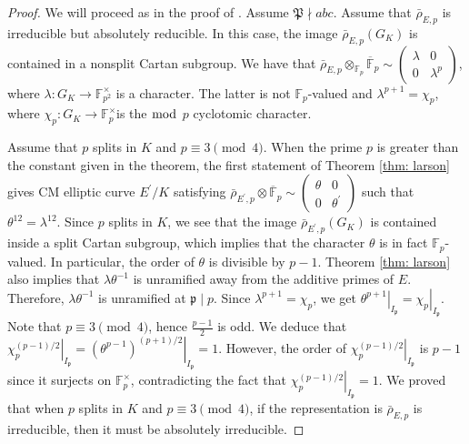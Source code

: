 \documentclass[]{article}
\newcommand {\mfp}{{\mathfrak{P}}}
\begin{document}
\begin{proof}
    We will proceed as in the proof of \cite[Theorem 1.5]{najman2021irreducibility}. Assume $\mfp\nmid abc$. Assume that $\bar{\rho}_{E, p}$ is irreducible but absolutely reducible. In this case, the image $\bar{\rho}_{E, p}(G_K)$ is contained in a nonsplit Cartan subgroup. We have that $\bar{\rho}_{E, p} \otimes_{\mathbb{F}_p} \overline{\mathbb{F}}_p \sim\left(\begin{array}{cc}\lambda & 0 \\ 0 & \lambda^p\end{array}\right)$, where $\lambda: G_K \rightarrow \mathbb{F}_{p^2}^{\times}$ is a character. The latter is not $\mathbb{F}_p$-valued and $\lambda^{p+1}=\chi_p$, where $\chi_p: G_K \rightarrow \mathbb{F}_p^{\times}$is the $\bmod $ $p$ cyclotomic character.

    Assume that $p$ splits in $K$ and $p \equiv 3\pmod 4$. When the prime $p$ is greater than the constant given in the theorem, the first statement of Theorem \ref{thm: larson} gives CM elliptic curve $E^{\prime} / K$ satisfying $\bar{\rho}_{E^{\prime}, p} \otimes \overline{\mathbb{F}}_p \sim\left(\begin{array}{cc}\theta & 0 \\ 0 & \theta^{\prime}\end{array}\right)$ such that $\theta^{12}=\lambda^{12}$. Since $p$ splits in $K$, we see that the image $\bar{\rho}_{E^{\prime}, p}\left(G_K\right)$ is contained inside a split Cartan subgroup, which implies that the character $\theta$ is in fact $\mathbb{F}_p$-valued. In particular, the order of $\theta$ is divisible by $p-1$. Theorem \ref{thm: larson} also implies that $\lambda \theta^{-1}$ is unramified away from the additive primes of $E$. Therefore, $\lambda \theta^{-1}$ is unramified at $\mathfrak{p} \mid p$. Since $\lambda^{p+1}=\chi_p$, we get $\left.\theta^{p+1}\right|_{I_{\mathfrak{p}}}=\left.\chi_p\right|_{I_{\mathfrak{p}}}$. Note that $p \equiv 3\pmod 4$, hence $\frac{p-1}{2}$ is odd. We deduce that $\left.\chi_p^{(p-1) / 2}\right|_{I_{\mathfrak{p}}}=\left.\left(\theta^{p-1}\right)^{(p+1) / 2}\right|_{I_{\mathfrak{p}}}=1$. However, the order of $\left.\chi_p^{(p-1) / 2}\right|_{I_{\mathfrak{p}}}$ is $p-1$ since it surjects on $\mathbb{F}_p^\times$, contradicting the fact that $\left.\chi_p^{(p-1) / 2}\right|_{I_{\mathfrak{p}}}=1$. We proved that when $p$ splits in $K$ and $p \equiv 3\pmod 4$, if the representation is $\bar{\rho}_{E, p}$ is irreducible, then it must be absolutely irreducible.
\end{proof}
\end{document}

